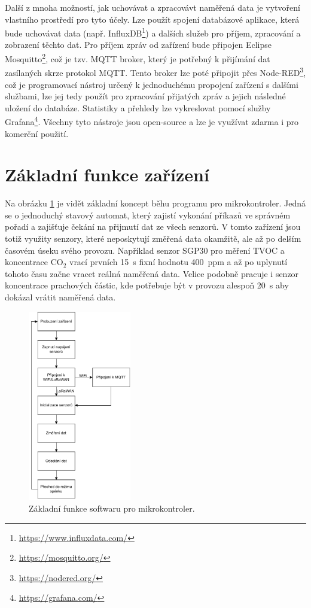 Další z mnoha možností, jak uchovávat a zpracovávt naměřená data je vytvoření vlastního prostředí pro tyto účely. Lze použít spojení databázové aplikace, která bude uchovávat data (např. InfluxDB\footnote{\url{https://www.influxdata.com/}}) a dalších služeb pro příjem, zpracování a zobrazení těchto dat. Pro příjem zpráv od zařízení bude připojen Eclipse Mosquitto\footnote{\url{https://mosquitto.org/}}, což je tzv. MQTT broker, který je potřebný k přijímání dat zasílaných skrze protokol MQTT. Tento broker lze poté připojit přes Node-RED\footnote{\url{https://nodered.org/}}, což je programovací nástroj určený k jednoduchému propojení zařízení s dalšími službami, lze jej tedy použít pro zpracování přijatých zpráv a jejich následné uložení do databáze. Statistiky a přehledy lze vykreslovat pomocí služby Grafana\footnote{\url{https://grafana.com/}}. Všechny tyto nástroje jsou open-source a lze je využívat zdarma i pro komerční použití.

\section{Základní funkce zařízení}

Na obrázku \ref{fig_flowchart} je vidět základní koncept běhu programu pro mikrokontroler. Jedná se o jednoduchý stavový automat, který zajistí vykonání příkazů ve správném pořadí a zajišťuje čekání na přijmutí dat ze všech senzorů. V tomto zařízení jsou totiž využity senzory, které neposkytují změřená data okamžitě, ale až po delším časovém úseku svého provozu. Například senzor SGP30 pro měření TVOC a koncentrace CO$_2$ vrací prvních \SI{15}{\second} fixní hodnotu 400~ppm a až po uplynutí tohoto času začne vracet reálná naměřená data. Velice podobně pracuje i senzor koncentrace prachových částic, kde potřebuje být v provozu alespoň \SI{20}{\second} aby dokázal vrátit naměřená data.

\begin{figure}[h]
    \centering
    \includegraphics[width=0.4\textwidth]{obrazky/flowchart.pdf}
    \caption{Základní funkce softwaru pro mikrokontroler.}
    \label{fig_flowchart}
\end{figure}

